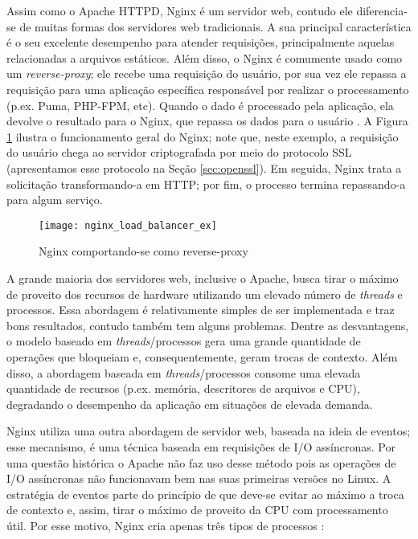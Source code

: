 Assim como o Apache HTTPD, Nginx é um servidor web, contudo ele diferencia-se
de muitas formas dos servidores web tradicionais. A sua principal
característica é o seu excelente desempenho para atender requisições,
principalmente aquelas relacionadas a arquivos estáticos. Além disso, o Nginx
é comumente usado como um \emph{reverse-proxy}; ele recebe uma requisição do
usuário, por sua vez ele repassa a requisição para uma aplicação específica
responsável por realizar o processamento (p.ex. Puma, PHP-FPM, etc). Quando o
dado é processado pela aplicação, ela devolve o resultado para o Nginx, que
repassa os dados para o usuário \citep{soni}. A Figura \ref{fig:nginx_basico}
ilustra o funcionamento geral do Nginx; note que, neste exemplo, a requisição
do usuário chega ao servidor criptografada por meio do protocolo SSL
(apresentamos esse protocolo na Seção \ref{sec:openssl}). Em seguida, Nginx
trata a solicitação transformando-a em HTTP; por fim, o processo termina
repassando-a para algum serviço.

\begin{figure}[!h]
  \centering
  \texttt{[image: nginx\_load\_balancer\_ex]} 
  \caption[Nginx comportando-se como reverse-proxy]{Nginx comportando-se como reverse-proxy \citep{soni}}
  \label{fig:nginx_basico} 
\end{figure}

A grande maioria dos servidores web, inclusive o Apache, busca tirar o máximo
de proveito dos recursos de hardware utilizando um elevado número de
\emph{threads} e processos. Essa abordagem é relativamente simples de ser
implementada e traz bons resultados, contudo também tem alguns problemas.
Dentre as desvantagens, o modelo baseado em \emph{threads}/processos gera uma
grande quantidade de operações que bloqueiam e, consequentemente, geram trocas
de contexto. Além disso, a abordagem baseada em \emph{threads}/processos
consome uma elevada quantidade de recursos (p.ex. memória, descritores de
arquivos e CPU), degradando o desempenho da aplicação em situações de elevada
demanda.

Nginx utiliza uma outra abordagem de servidor web, baseada na ideia de eventos;
esse mecanismo, é uma técnica baseada em requisições de I/O assíncronas. Por
uma questão histórica o Apache não faz uso desse método pois as operações de
I/O assíncronas não funcionavam bem nas suas primeiras versões no Linux. A
estratégia de eventos parte do princípio de que deve-se evitar ao máximo a
troca de contexto e, assim, tirar o máximo de proveito da CPU com processamento
útil.  Por esse motivo, Nginx cria apenas três tipos de processos
\citep{nginx_architecture}:


